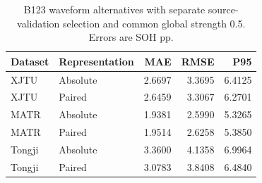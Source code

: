 \begin{table}[H]\centering
\caption{B123 waveform alternatives with separate source-validation selection and common global strength 0.5. Errors are SOH pp.}\label{tab:sm3selected}
\papertablesize\setlength{\tabcolsep}{4pt}\renewcommand{\arraystretch}{1.15}
\begin{tabular}{llrrr}\toprule
Dataset & Representation & MAE & RMSE & P95 \\ \midrule
XJTU & Absolute & 2.6697 & 3.3695 & 6.4125 \\
XJTU & Paired & 2.6459 & 3.3067 & 6.2701 \\
MATR & Absolute & 1.9381 & 2.5990 & 5.3265 \\
MATR & Paired & 1.9514 & 2.6258 & 5.3850 \\
Tongji & Absolute & 3.3600 & 4.1358 & 6.9964 \\
Tongji & Paired & 3.0783 & 3.8408 & 6.4840 \\
\bottomrule\end{tabular}
\end{table}
